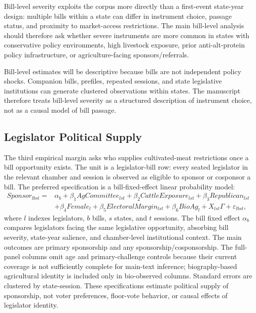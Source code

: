 \documentclass[12pt]{article}
\begin{document}
Bill-level severity exploits the corpus more directly than a first-event state-year design: multiple bills within a state can differ in instrument choice, passage status, and proximity to market-access restrictions.  The main bill-level analysis should therefore ask whether severe instruments are more common in states with conservative policy environments, high livestock exposure, prior anti-alt-protein policy infrastructure, or agriculture-facing sponsors/referrals.

Bill-level estimates will be descriptive because bills are not independent policy shocks.  Companion bills, prefiles, repeated sessions, and state legislative institutions can generate clustered observations within states.  The manuscript therefore treats bill-level severity as a structured description of instrument choice, not as a causal model of bill passage.

\subsection{Legislator Political Supply}
\label{sec:political_supply_design}

The third empirical margin asks who supplies cultivated-meat restrictions once a bill opportunity exists.  The unit is a legislator-bill row: every seated legislator in the relevant chamber and session is observed as eligible to sponsor or cosponsor a bill.  The preferred specification is a bill-fixed-effect linear probability model:
\begin{equation}
\begin{aligned}
Sponsor_{lbst}
= {} & \alpha_b
+ \beta_1 AgCommittee_{lst}
+ \beta_2 CattleExposure_{lst}
+ \beta_3 Republican_{lst} \\
&+ \beta_4 Female_l
+ \beta_5 ElectoralMargin_{lst}
+ \beta_6 BioAg_l
+ X_{lst}\Gamma
+ \varepsilon_{lbst},
\end{aligned}
\label{eq:political_supply}
\end{equation}
where $l$ indexes legislators, $b$ bills, $s$ states, and $t$ sessions.  The bill fixed effect $\alpha_b$ compares legislators facing the same legislative opportunity, absorbing bill severity, state-year salience, and chamber-level institutional context.  The main outcomes are primary sponsorship and any sponsorship/cosponsorship.  The full-panel columns omit age and primary-challenge controls because their current coverage is not sufficiently complete for main-text inference; biography-based agricultural identity is included only in bio-observed columns.  Standard errors are clustered by state-session.  These specifications estimate political supply of sponsorship, not voter preferences, floor-vote behavior, or causal effects of legislator identity.
\end{document}

